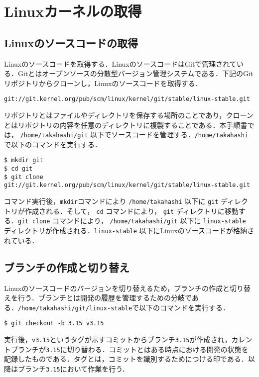 \documentclass[12pt]{jsarticle}
\begin{document}
\newpage
\section{Linuxカーネルの取得}
\label{sec:getkernel}
\subsection{Linuxのソースコードの取得}
Linuxのソースコードを取得する．LinuxのソースコードはGitで管理されている．Gitとはオープンソースの分散型バージョン管理システムである．下記のGitリポジトリからクローンし，Linuxのソースコードを取得する．

\begin{verbatim}
git://git.kernel.org/pub/scm/linux/kernel/git/stable/linux-stable.git
\end{verbatim}
リポジトリとはファイルやディレクトリを保存する場所のことであり，クローンとはリポジトリの内容を任意のディレクトリに複製することである．本手順書では， \verb|/home/takahashi/git| 以下でソースコードを管理する．\verb|/home/takahashi| で以下のコマンドを実行する．

\begin{verbatim}
$ mkdir git
$ cd git
$ git clone git://git.kernel.org/pub/scm/linux/kernel/git/stable/linux-stable.git
\end{verbatim}
コマンド実行後，\verb|mkdir|コマンドにより \verb|/home/takahashi| 以下に \verb|git| ディレクトリが作成される．そして， \verb|cd| コマンドにより， \verb|git| ディレクトリに移動する．\verb|git clone| コマンドにより， \verb|/home/takahashi/git| 以下に \verb|linux-stable| ディレクトリが作成される．\verb|linux-stable| 以下にLinuxのソースコードが格納されている．

\subsection{ブランチの作成と切り替え}
Linuxのソースコードのバージョンを切り替えるため，ブランチの作成と切り替えを行う．ブランチとは開発の履歴を管理するための分岐である．\verb|/home/takahashi/git/linux-stable|で以下のコマンドを実行する．

\begin{verbatim}
$ git checkout -b 3.15 v3.15
\end{verbatim}
実行後，\verb|v3.15|というタグが示すコミットからブランチ\verb|3.15|が作成され，カレントブランチが\verb|3.15|に切り替わる．コミットとはある時点における開発の状態を記録したものである．タグとは，コミットを識別するためにつける印である．以降はブランチ\verb|3.15|において作業を行う．
\end{document}
